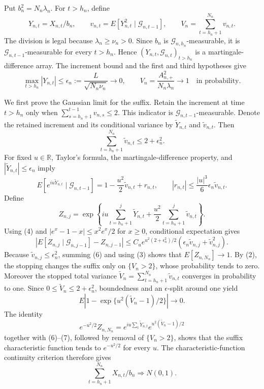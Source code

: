 Put \(b_n^2=N_n\lambda_n\).  For \(t>h_n\), define
\[
 Y_{n,t}=X_{n,t}/b_n,\qquad
 v_{n,t}=E[Y_{n,t}^2\mid\mathcal G_{n,t-1}],\qquad
 V_n=\sum_{t=h_n+1}^{N_n}v_{n,t}.
\tag{1}
\]
The division is legal because \(\lambda_n\ge\nu_n>0\).  Since \(b_n\) is
\(\mathcal G_{n,h_n}\)-measurable, it is
\(\mathcal G_{n,t-1}\)-measurable for every \(t>h_n\).  Hence
\((Y_{n,t},\mathcal G_{n,t})_{t>h_n}\) is a martingale-difference array.
The increment bound and the first and third hypotheses give
\[
 \max_{t>h_n}|Y_{n,t}|
 \le\epsilon_n:=\frac{L}{\sqrt{N_n\nu_n}}\longrightarrow0,
 \qquad
 V_n=\frac{A_{n,+}^2}{N_n\lambda_n}\longrightarrow1
 \quad\text{in probability}.
\tag{2}
\]

We first prove the Gaussian limit for the suffix.  Retain the increment at
time \(t>h_n\) only when
\(\sum_{s=h_n+1}^{t-1}v_{n,s}\le2\).  This indicator is
\(\mathcal G_{n,t-1}\)-measurable.  Denote the retained increment and its
conditional variance by \(\widetilde Y_{n,t}\) and
\(\widetilde v_{n,t}\).  Then
\[
 \sum_{t=h_n+1}^{N_n}\widetilde v_{n,t}\le2+\epsilon_n^2.
\tag{3}
\]
For fixed \(u\in\mathbb R\), Taylor's formula, the martingale-difference
property, and \(|\widetilde Y_{n,t}|\le\epsilon_n\) imply
\[
 E[e^{iu\widetilde Y_{n,t}}\mid\mathcal G_{n,t-1}]
 =1-\frac{u^2}{2}\widetilde v_{n,t}+r_{n,t},
 \qquad
 |r_{n,t}|\le\frac{|u|^3}{6}\epsilon_n\widetilde v_{n,t}.
\tag{4}
\]
Define
\[
 Z_{n,j}=\exp\!\left\{iu\sum_{t=h_n+1}^j\widetilde Y_{n,t}
 +\frac{u^2}{2}\sum_{t=h_n+1}^j\widetilde v_{n,t}\right\}.
\tag{5}
\]
Using (4) and \(|e^x-1-x|\le x^2e^x/2\) for \(x\ge0\), conditional
expectation gives
\[
 \left|E[Z_{n,j}\mid\mathcal G_{n,j-1}]-Z_{n,j-1}\right|
 \le C_u e^{u^2(2+\epsilon_n^2)/2}
 \left(\epsilon_n\widetilde v_{n,j}+\widetilde v_{n,j}^2\right).
\tag{6}
\]
Because \(\widetilde v_{n,j}\le\epsilon_n^2\), summing (6) and using (3)
shows that \(E[Z_{n,N_n}]\to1\).  By (2), the stopping changes the suffix
only on \(\{V_n>2\}\), whose probability tends to zero.  Moreover the
stopped total variance
\(\widetilde V_n=\sum_{t=h_n+1}^{N_n}\widetilde v_{n,t}\) converges in
probability to one.  Since \(0\le\widetilde V_n\le2+\epsilon_n^2\),
boundedness and an \(\epsilon\)-split around one yield
\[
 E\left|1-\exp\{u^2(\widetilde V_n-1)/2\}\right|\longrightarrow0.
\tag{7}
\]
The identity
\[
 e^{-u^2/2}Z_{n,N_n}
 =e^{iu\sum_t\widetilde Y_{n,t}}
 e^{u^2(\widetilde V_n-1)/2}
\]
together with (6)--(7), followed by removal of \(\{V_n>2\}\), shows that
the suffix characteristic function tends to \(e^{-u^2/2}\) for every
\(u\).  The characteristic-function continuity criterion therefore gives
\[
 \sum_{t=h_n+1}^{N_n}X_{n,t}/b_n\Rightarrow N(0,1).
\tag{8}
\]

